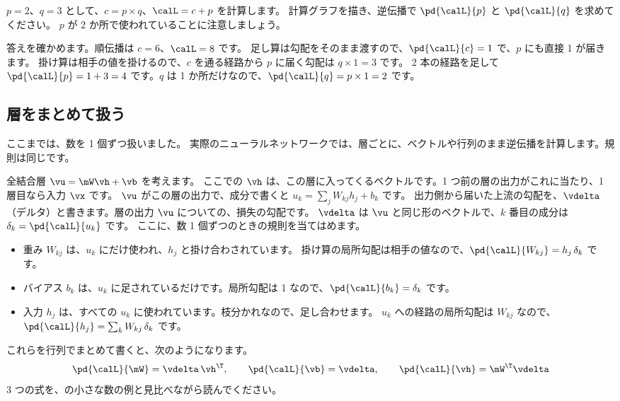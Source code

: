 \begin{quiz}
$p=2$、$q=3$ として、$c=p\times q$、$\calL=c+p$ を計算します。
計算グラフを描き、逆伝播で $\pd{\calL}{p}$ と $\pd{\calL}{q}$ を求めてください。
$p$ が 2 か所で使われていることに注意しましょう。
\end{quiz}

答えを確かめます。順伝播は $c=6$、$\calL=8$ です。
足し算は勾配をそのまま渡すので、$\pd{\calL}{c}=1$ で、$p$ にも直接 1 が届きます。
掛け算は相手の値を掛けるので、$c$ を通る経路から $p$ に届く勾配は $q\times 1=3$ です。
2 本の経路を足して $\pd{\calL}{p}=1+3=4$ です。$q$ は 1 か所だけなので、$\pd{\calL}{q}=p\times 1=2$ です。

\subsection*{層をまとめて扱う}

ここまでは、数を 1 個ずつ扱いました。
実際のニューラルネットワークでは、層ごとに、ベクトルや行列のまま逆伝播を計算します。規則は同じです。

全結合層 $\vu=\mW\vh+\vb$ を考えます。
ここでの $\vh$ は、この層に入ってくるベクトルです。1 つ前の層の出力がこれに当たり、1 層目なら入力 $\vx$ です。
$\vu$ がこの層の出力で、成分で書くと $u_k=\sum_j W_{kj}h_j+b_k$ です。
出力側から届いた上流の勾配を、$\vdelta$（デルタ）と書きます。層の出力 $\vu$ についての、損失の勾配です。
$\vdelta$ は $\vu$ と同じ形のベクトルで、$k$ 番目の成分は $\delta_k=\pd{\calL}{u_k}$ です。
ここに、数 1 個ずつのときの規則を当てはめます。
\begin{itemize}
\item 重み $W_{kj}$ は、$u_k$ にだけ使われ、$h_j$ と掛け合わされています。
掛け算の局所勾配は相手の値なので、$\pd{\calL}{W_{kj}}=h_j\,\delta_k$ です。
\item バイアス $b_k$ は、$u_k$ に足されているだけです。局所勾配は 1 なので、$\pd{\calL}{b_k}=\delta_k$ です。
\item 入力 $h_j$ は、すべての $u_k$ に使われています。枝分かれなので、足し合わせます。
$u_k$ への経路の局所勾配は $W_{kj}$ なので、$\pd{\calL}{h_j}=\sum_k W_{kj}\,\delta_k$ です。
\end{itemize}
これらを行列でまとめて書くと、次のようになります。
\begin{equation}
\pd{\calL}{\mW}=\vdelta\,\vh^\T,\qquad
\pd{\calL}{\vb}=\vdelta,\qquad
\pd{\calL}{\vh}=\mW^\T\vdelta
\label{eq:nn-layer-backward}
\end{equation}
3 つの式を、の小さな数の例と見比べながら読んでください。

